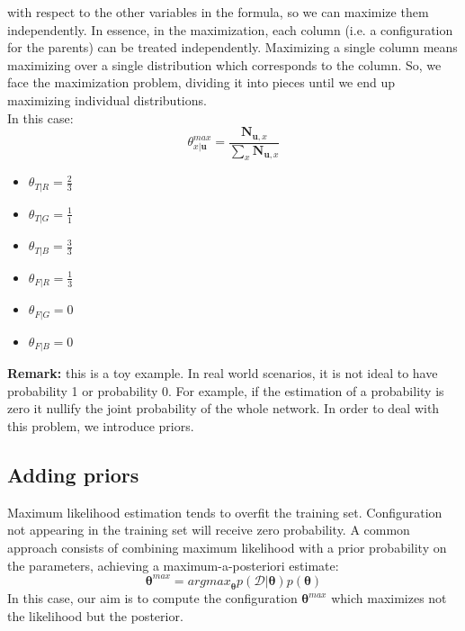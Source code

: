 with respect to the other variables in the formula, so we can maximize them
independently. In essence, in the maximization, each column (i.e. a configuration
for the parents) can be treated independently. Maximizing a single column means maximizing
over a single distribution which corresponds to the column. So, we face the maximization
problem, dividing it into pieces until we end up maximizing individual
distributions. \\ In this case:
\begin{equation}
	\label{eq:parameterMaximizationGraphicalModel}\theta^{\mathit{max}}_{x|\pmb{u}}
	= \frac{\pmb{N}_{\pmb{u},x}}{\sum_{x} \pmb{N}_{\pmb{u},x}}
\end{equation}
\begin{itemize}
	\item $\theta_{T|R}= \frac{2}{3}$

	\item $\theta_{T|G}= \frac{1}{1}$

	\item $\theta_{T|B}= \frac{3}{3}$

	\item $\theta_{F|R}= \frac{1}{3}$

	\item $\theta_{F|G}= 0$

	\item $\theta_{F|B}= 0$
\end{itemize}

\textbf{Remark:} this is a toy example. In real world scenarios, it is not ideal
to have probability 1 or probability 0. For example, if the estimation of a probability
is zero it nullify the joint probability of the whole network. In order to deal
with this problem, we introduce priors.

\subsection{Adding priors}
Maximum likelihood estimation tends to overfit the training set. Configuration
not appearing in the training set will receive zero probability. A common approach
consists of combining maximum likelihood with a prior probability on the parameters,
achieving a maximum-a-posteriori estimate:
\begin{equation}
	\pmb{\theta}^{\mathit{max}}= \mathit{argmax}_{\pmb{\theta}}p(\mathcal{D}|\pmb{\theta}
	)p(\pmb{\theta})
\end{equation}
In this case, our aim is to compute the configuration
$\pmb{\theta}^{\mathit{max}}$ which maximizes not the likelihood but the
posterior.
\newline

